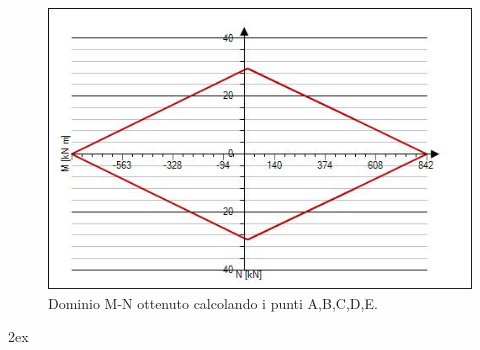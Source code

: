 \documentclass[a4paper,12pt, oneside]{book}
\begin{document}
    \begin{figure}[H]
    	\centering
    	\includegraphics[width=0.7\linewidth]{"immagini/dominio mn"}
    	\caption{Dominio M-N ottenuto calcolando i punti A,B,C,D,E.}
    	\label{fig:dominio-mn}
    \end{figure}
    
    
    
    

	\newpage
	\begingroup
	\parindent 0pt
	\parskip 2ex
	\def\enotesize{\normalsize}
	\theendnotes
	\endgroup
\end{document}
